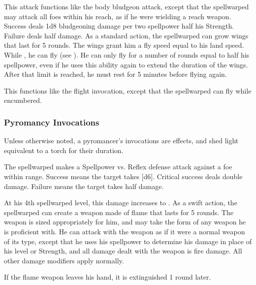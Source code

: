             This attack functions like the body bludgeon attack, except that the spellwarped may attack all foes within his reach, as if he were wielding a reach weapon.
            Success deals 1d8 bludgeoning damage per two spellpower \add half his Strength.
            Failure deals half damage.
            As a standard action, the spellwarped can grow wings that last for 5 rounds.
            The wings grant him a fly speed equal to his land speed.
            While \unencumbered, he can fly (see ).
            He can only fly for a number of rounds equal to half his spellpower, even if he uses this ability again to extend the duration of the wings.
            After that limit is reached, he must rest for 5 minutes before flying again.

            This functions like the flight invocation, except that the spellwarped can fly while encumbered.

        \subsubsection{Pyromancy Invocations}
            Unless otherwise noted, a pyromancer's invocations are  effects, and shed light equivalent to a torch for their duration.

            The spellwarped makes a Spellpower vs. Reflex defense attack against a foe within \rngmed range.
            Success means the target takes [d6].
            Critical success deals double damage.
            Failure means the target takes half damage.
            \par At his 4th spellwarped level, this damage increases to .
            As a swift action, the spellwarped can create a weapon made of flame that lasts for 5 rounds.
            The weapon is sized appropriately for him, and may take the form of any weapon he is proficient with.
            He can attack with the weapon as if it were a normal weapon of its type, except that he uses his spellpower to determine his damage in place of his level or Strength, and all damage dealt with the weapon is fire damage.
            All other damage modifiers apply normally.
            \par If the flame weapon leaves his hand, it is extinguished 1 round later.

